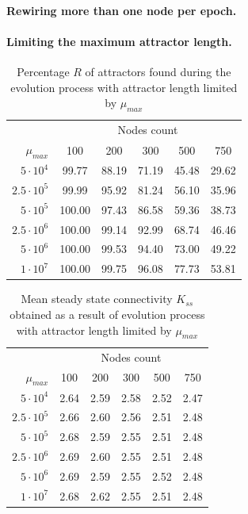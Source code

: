 \documentclass[procedia]{easychair}
\begin{document}
	\paragraph{Rewiring more than one node per epoch.}
	
	\paragraph{Limiting the maximum attractor length.}
	
	\begin{table}[ht!]
		\centering
		\begin{tabular}{r | c c c c c}
			& \multicolumn{5}{c}{Nodes count} \\
			$\mu_{max}$	& 100	& 	200	&	300	&	500	&	750\\ \hline
			$5 \cdot 10^4$	&	99.77	&	88.19	&	71.19	&	45.48	&	29.62\\
			$2.5 \cdot 10^5$	&	99.99	&	95.92	&	81.24	&	56.10	&	35.96\\
			$5 \cdot 10^5$	&	100.00	&	97.43	&	86.58	&	59.36	&	38.73\\
			$2.5 \cdot 10^6$	&	100.00	&	99.14	&	92.99	&	68.74	&	46.46\\
			$5 \cdot 10^6$	&	100.00	&	99.53	&	94.40	&	73.00	&	49.22\\
			$1 \cdot 10^7$	&	100.00	&	99.75	&	96.08	&	77.73	&	53.81\\
		\end{tabular}
		\caption{Percentage $R$ of attractors found during the evolution process with attractor length limited by $\mu_{max}$}
	\end{table}
	\begin{table}[ht!]
		\centering
		\begin{tabular}{r | c c c c c}
			& \multicolumn{5}{c}{Nodes count} \\
			$\mu_{max}$	& 100	& 	200	&	300	&	500	& 750\\
			\hline
			$5 \cdot 10^4$	&	2.64	&	2.59	&	2.58	&	2.52	&	2.47\\
			$2.5 \cdot 10^5$	&	2.66	&	2.60	&	2.56	&	2.51	&	2.48\\
			$5 \cdot 10^5$	&	2.68	&	2.59	&	2.55	&	2.51	&	2.48\\
			$2.5 \cdot 10^6$	&	2.69	&	2.60	&	2.55	&	2.51	&	2.48\\
			$5 \cdot 10^6$	&	2.69	&	2.59	&	2.55	&	2.52	&	2.48\\
			$1 \cdot 10^7$	&	2.68	&	2.62	&	2.55	&	2.51	&	2.48\\
		\end{tabular}
		\caption{Mean steady state connectivity $K_{ss}$ obtained as a result of evolution process with attractor length limited by $\mu_{max}$}
	\end{table}
	
\end{document}
